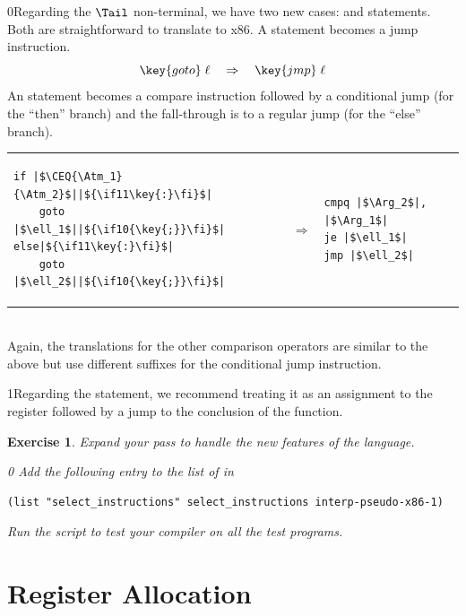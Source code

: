\documentclass[7x10]{TimesAPriori_MIT}%
\def\racketEd{0}
\def\pythonEd{1}
\def\edition{1}
\newcommand{\racket}[1]{{\if\edition\racketEd{#1}\fi}}
\newcommand{\python}[1]{{\if\edition\pythonEd #1\fi}}
\newtheorem{exercise}[theorem]{Exercise}
\begin{document}
\racket{Regarding the $\Tail$ non-terminal, we have two new cases:
  \key{goto} and \key{if} statements. Both are straightforward to
  translate to x86.}
%
A  statement becomes a jump instruction.
\[
\key{goto}\; \ell\racket{\key{;}} \quad \Rightarrow \quad \key{jmp}\;\ell
\]
%
An  statement becomes a compare instruction followed by a
conditional jump (for the ``then'' branch) and the fall-through is to
a regular jump (for the ``else'' branch).\\
\begin{tabular}{lll}
\begin{minipage}{0.4\textwidth}
\begin{lstlisting}
if |$\CEQ{\Atm_1}{\Atm_2}$||$\python{\key{:}}$|
    goto |$\ell_1$||$\racket{\key{;}}$|
else|$\python{\key{:}}$|
    goto |$\ell_2$||$\racket{\key{;}}$|
\end{lstlisting}
\end{minipage}
&
$\Rightarrow$
&
\begin{minipage}{0.4\textwidth}
\begin{lstlisting}
cmpq |$\Arg_2$|, |$\Arg_1$|
je |$\ell_1$|
jmp |$\ell_2$|
\end{lstlisting}
\end{minipage}
\end{tabular}  \\
Again, the translations for the other comparison operators are similar to the
above but use different suffixes for the conditional jump instruction.

\python{Regarding the  statement, we recommend treating it
  as an assignment to the \key{rax} register followed by a jump to the
  conclusion of the \code{main} function.}

\begin{exercise}\normalfont
Expand your  pass to handle the new
features of the \LangIf{} language.
%
{\if\edition\racketEd
Add the following entry to the list of  in
\begin{lstlisting}
(list "select_instructions" select_instructions interp-pseudo-x86-1)
\end{lstlisting}
\fi}
%
Run the script to test your compiler on all the test programs.
\end{exercise}

\section{Register Allocation}
\label{sec:register-allocation-Lif}
\end{document}
